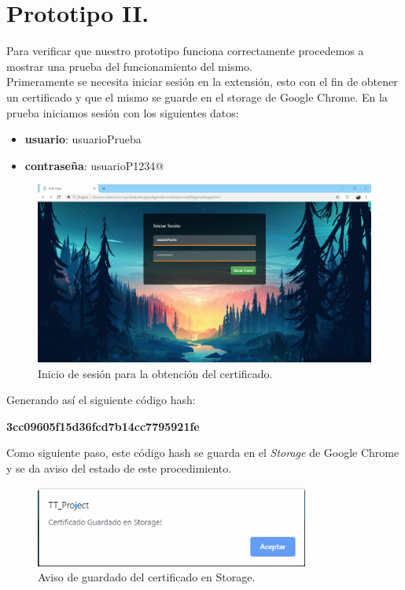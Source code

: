 \documentclass[12pt, a4paper, titlepage]{report}
\begin{document}
    
        \section{Prototipo II.}
            Para verificar que nuestro prototipo funciona correctamente procedemos a mostrar una prueba del funcionamiento del mismo.\\ Primeramente se necesita iniciar sesión en la extensión, esto con el fin de obtener un certificado y que el mismo se guarde en el storage de Google Chrome. En la prueba iniciamos sesión con los siguientes datos: 
    
            \begin{itemize}
                \item \textbf{usuario}: usuarioPrueba
                \item \textbf{contraseña}: usuarioP1234@
            \end{itemize}
    
            \begin{figure}[H]
        		\begin{center}	\includegraphics[width=13cm]{./imagenes/Pruebas/Prototipo_2/inicioSesion_prueba.PNG}
        			\caption{Inicio de sesión para la obtención del certificado.}
        		\end{center}
        	\end{figure}
	        Generando así el siguiente código hash:
        	\begin{center}
        	    \textbf{3cc09605f15d36fcd7b14cc7795921fe}
        	\end{center}
        	Como siguiente paso, este código hash se guarda en el \textit{Storage} de Google Chrome y se da aviso del estado de este procedimiento.
	
        	\begin{figure}[H]
        		\begin{center}	\includegraphics[width=9cm]{./imagenes/Pruebas/Prototipo_2/certificadoStorage.PNG}
        			\caption{Aviso de guardado del certificado en Storage.}
        		\end{center}
        	\end{figure}
	
\end{document}
